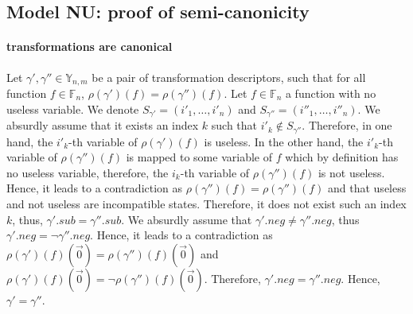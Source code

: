 \documentclass[a4paper,10pt]{article}
\newcommand{\F}{\mathbb{F}}
\newcommand{\Y}{\mathbb{Y}}
\begin{document}
\subsection{Model NU: proof of semi-canonicity\label{grobdd-model-nu}}

\paragraph{transformations are canonical\\}
Let $\gamma', \gamma''\in\Y_{n, m}$ be a pair of transformation descriptors, such that for all function $f\in\F_n$, $\rho(\gamma')(f) = \rho(\gamma'')(f)$.
Let $f\in\F_n$ a function with no useless variable.
We denote $S_{\gamma'} = (i'_1, \dots, i'_n)$ and $S_{\gamma''} = (i''_1, \dots, i''_n)$.
We absurdly assume that it exists an index $k$ such that $i'_k \not\in S_{\gamma''}$.
Therefore, in one hand, the $i'_k$-th variable of $\rho(\gamma')(f)$ is useless.
In the other hand, the $i'_k$-th variable of $\rho(\gamma'')(f)$ is mapped to some variable of $f$ which by definition has no useless variable, therefore, the $i_k$-th variable of $\rho(\gamma'')(f)$ is not useless.
Hence, it leads to a contradiction as $\rho(\gamma'')(f) = \rho(\gamma'')(f)$ and that useless and not useless are incompatible states.
Therefore, it does not exist such an index $k$, thus, $\gamma'.sub = \gamma''.sub$.
We absurdly assume that $\gamma'.neg \neq \gamma''.neg$, thus $\gamma'.neg = \lnot \gamma''.neg$.
Hence, it leads to a contradiction as $\rho(\gamma')(f)(\vec{0}) = \rho(\gamma'')(f)(\vec{0})$ and $\rho(\gamma')(f)(\vec{0}) = \lnot \rho(\gamma'')(f)(\vec{0})$.
Therefore, $\gamma'.neg = \gamma''.neg$.
Hence, $\gamma' = \gamma''$.
\end{document}
